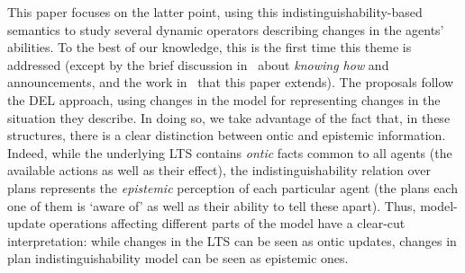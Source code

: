 %
%
%



This paper focuses on the latter point, using this in\-dis\-tin\-guisha\-bil\-i\-ty-based semantics to study several dynamic operators describing changes in the agents' abilities. To the best of our knowledge, this is the first time this theme is addressed (except by the brief discussion in~\cite{Wang2016} about \emph{knowing how} and announcements, and the work in~\cite{AFSV22} that this paper extends). The proposals follow the DEL approach, using changes in the model for representing changes in the situation they describe. In doing so, we take advantage of the fact that, in these structures, there is a clear distinction between ontic and epistemic information. Indeed, while the underlying LTS contains \emph{ontic} facts common to all agents (the available actions as well as their effect), the indistinguishability relation over plans represents the \emph{epistemic} perception of each particular agent (the plans each one of them is `aware of' as well as their ability to tell these apart). Thus, model-update operations affecting different parts of the model have a clear-cut interpretation: while changes in the LTS can be seen as ontic updates, changes in plan indistinguishability model can be seen as epistemic ones. 


